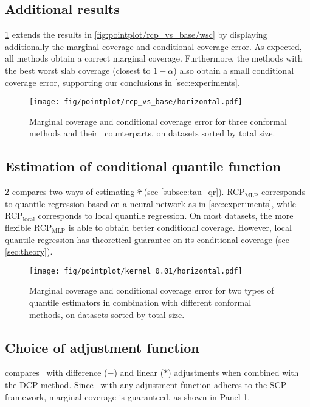 
\subsection{Additional results}
\label{sec:additional_results}
  \cref{fig:pointplot/rcp_vs_base/horizontal} extends the results in \cref{fig:pointplot/rcp_vs_base/wsc} by displaying additionally the marginal coverage and conditional coverage error. As expected, all methods obtain a correct marginal coverage. Furthermore, the methods with the best worst slab coverage (closest to $1 - \alpha$) also obtain a small conditional coverage error, supporting our conclusions in \cref{sec:experiments}.

  \begin{figure}[H]
    \centering
    \texttt{[image: fig/pointplot/rcp\_vs\_base/horizontal.pdf]}
    \caption{Marginal coverage and conditional coverage error for three conformal methods and their \RCP\ counterparts, on datasets sorted by total size.}
    \label{fig:pointplot/rcp_vs_base/horizontal}
  \end{figure}


\subsection{Estimation of conditional quantile function}
\label{sec:tau_testimation}
  \cref{fig:pointplot/kernel_0.01/horizontal} compares two ways of estimating $\widehat{\tau}$ (see \cref{subsec:tau_qr}). RCP$_\text{MLP}$ corresponds to quantile regression based on a neural network as in \cref{sec:experiments}, while RCP$_\text{local}$ corresponds to local quantile regression. On most datasets, the more flexible RCP$_\text{MLP}$ is able to obtain better conditional coverage. However, local quantile regression has theoretical guarantee on its conditional coverage (see \cref{sec:theory}).

  \begin{figure}[H]
    \centering
    \texttt{[image: fig/pointplot/kernel\_0.01/horizontal.pdf]}
    \caption{Marginal coverage and conditional coverage error for two types of quantile estimators in combination with different conformal methods, on datasets sorted by total size.}
    \label{fig:pointplot/kernel_0.01/horizontal}
  \end{figure}


\subsection{Choice of adjustment function}
\label{sec:adj_function}
   compares \RCP\ with difference ($-$) and linear ($*$) adjustments when combined with the DCP method. Since \RCP\ with any adjustment function adheres to the SCP framework, marginal coverage is guaranteed, as shown in Panel 1.

